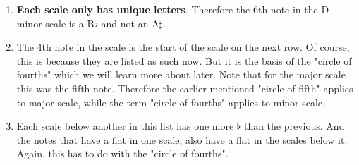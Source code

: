 \begin{enumerate}
	\item \textbf{Each scale only has unique letters}. Therefore the 6th note in the D minor scale is a B$\flat$ and not an A$\sharp$.
	\item The 4th note in the scale is the start of the scale on the next row. Of course, this is because they are listed as such now. But it is the basis of the "circle of fourths" which we will learn more about later. Note that for the major scale this was the fifth note. Therefore the earlier mentioned "circle of fifth" applies to major scale, while the term "circle of fourths" applies to minor scale.
	\item Each scale below another in this list has one more $\flat$ than the previous. And the notes that have a flat in one scale, also have a flat in the scales below it. Again, this has to do with the "circle of fourths".
\end{enumerate}

